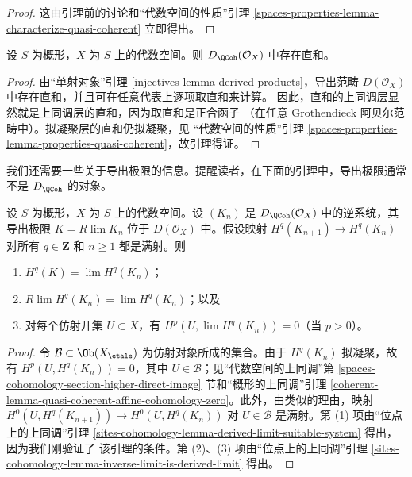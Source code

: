 \begin{proof}
这由引理前的讨论和“代数空间的性质”引理
\ref{spaces-properties-lemma-characterize-quasi-coherent} 立即得出。
\end{proof}

\begin{lemma}
\label{lemma-quasi-coherence-direct-sums}
设 $S$ 为概形，$X$ 为 $S$ 上的代数空间。则
$D_\QCoh(\mathcal{O}_X)$ 中存在直和。
\end{lemma}

\begin{proof}
由“单射对象”引理 \ref{injectives-lemma-derived-products}，导出范畴
$D(\mathcal{O}_X)$ 中存在直和，并且可在任意代表上逐项取直和来计算。
因此，直和的上同调层显然就是上同调层的直和，因为取直和是正合函子
（在任意 Grothendieck 阿贝尔范畴中）。拟凝聚层的直和仍拟凝聚，见
“代数空间的性质”引理
\ref{spaces-properties-lemma-properties-quasi-coherent}，故引理得证。
\end{proof}

\noindent
我们还需要一些关于导出极限的信息。提醒读者，在下面的引理中，导出极限通常
不是 $D_\QCoh$ 的对象。

\begin{lemma}
\label{lemma-Rlim-quasi-coherent}
设 $S$ 为概形，$X$ 为 $S$ 上的代数空间。设 $(K_n)$ 是
$D_\QCoh(\mathcal{O}_X)$ 中的逆系统，其导出极限
$K = R\lim K_n$ 位于 $D(\mathcal{O}_X)$ 中。假设映射
$H^q(K_{n + 1}) \to H^q(K_n)$ 对所有 $q \in \mathbf{Z}$ 和
$n \geq 1$ 都是满射。则
\begin{enumerate}
\item $H^q(K) = \lim H^q(K_n)$；
\item $R\lim H^q(K_n) = \lim H^q(K_n)$；以及
\item 对每个仿射开集 $U \subset X$，有
$H^p(U, \lim H^q(K_n)) = 0$（当 $p > 0$）。
\end{enumerate}
\end{lemma}

\begin{proof}
令 $\mathcal{B} \subset \Ob(X_\etale)$ 为仿射对象所成的集合。由于
$H^q(K_n)$ 拟凝聚，故有 $H^p(U, H^q(K_n)) = 0$，其中
$U \in \mathcal{B}$；见“代数空间的上同调”第
\ref{spaces-cohomology-section-higher-direct-image} 节和“概形的上同调”引理
\ref{coherent-lemma-quasi-coherent-affine-cohomology-zero}。此外，由类似的理由，映射
$H^0(U, H^q(K_{n + 1})) \to H^0(U, H^q(K_n))$ 对
$U \in \mathcal{B}$ 是满射。第 (1) 项由“位点上的上同调”引理
\ref{sites-cohomology-lemma-derived-limit-suitable-system} 得出，因为我们刚验证了
该引理的条件。第 (2)、(3) 项由“位点上的上同调”引理
\ref{sites-cohomology-lemma-inverse-limit-is-derived-limit} 得出。
\end{proof}

